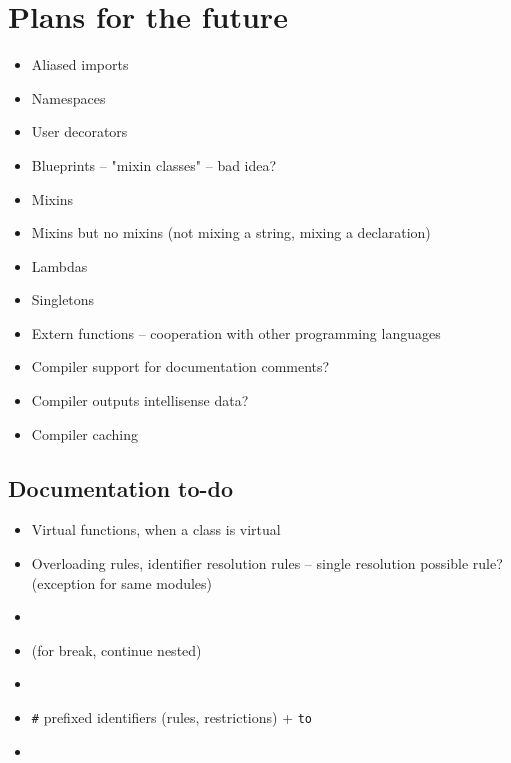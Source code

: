 \chapter{Plans for the future}
\begin{itemize}
	\item Aliased imports
	\item Namespaces
	\item User decorators
	\item Blueprints -- "mixin classes" -- bad idea?
	\item Mixins
	\item Mixins but no mixins (not mixing a string, mixing a declaration)
	\item Lambdas
	\item Singletons
	\item Extern functions -- cooperation with other programming languages
	\item Compiler support for documentation comments?
	\item Compiler outputs intellisense data?
	\item Compiler caching
\end{itemize}

\section{Documentation to-do}
\begin{itemize}
	\item Virtual functions, when a class is virtual
	\item Overloading rules, identifier resolution rules -- single resolution possible rule? (exception for same modules)
	\item {}
	\item {} (for break, continue nested)
	\item {}
	\item \verb|#| prefixed identifiers (rules, restrictions) + \verb|to|
	\item {}
\end{itemize}

